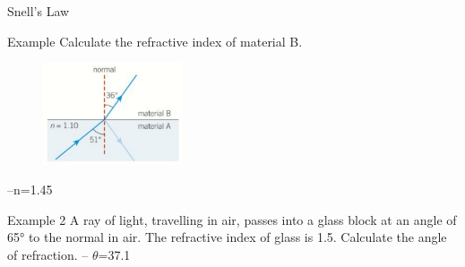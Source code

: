 \documentclass[../Main.tex]{subfiles}
\begin{document}
\begin{frame}{Snell's Law}
    \begin{exampleblock}{Example}
    Calculate the refractive index of material B.
    \begin{figure}
        \centering
        \includegraphics[height=3cm]{Waves_Images/snellslawexample.jpg}
    \end{figure} \pause
    --n=1.45
    \end{exampleblock} \pause
    \begin{exampleblock}{Example 2}
    A ray of light, travelling in air, passes into a glass block at an angle of 65° to the normal in air. The refractive index of glass is 1.5. Calculate the angle of refraction. \pause 
    -- $\theta$=37.1
    \end{exampleblock}
\end{frame}
\end{document}

